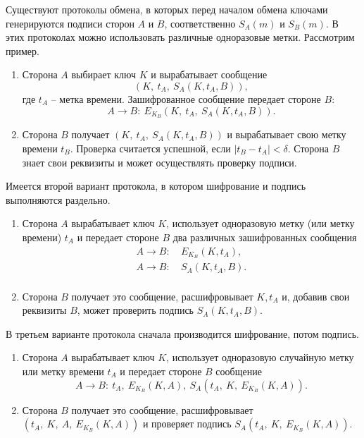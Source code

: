 \documentclass[10pt,a4paper]{book}
\begin{document}
Существуют протоколы обмена, в которых перед началом обмена ключами генерируются подписи сторон $A$ и $B$, соответственно $S_A(m)$ и $S_B(m)$. В этих протоколах можно использовать различные одноразовые метки. Рассмотрим пример.
\begin{enumerate}
    \item Сторона $A$ выбирает ключ $K$ и вырабатывает сообщение
            \[ \left( K, ~ t_A, ~ S_A(K, t_A, B) \right), \]
        где $t_A$ -- метка времени. Зашифрованное сообщение передает стороне $B$:
        \[ A \rightarrow B: ~ E_{K_B}(K, ~ t_A, ~ S_A(K, t_A, B)). \]
    \item Сторона $B$ получает $\left( K, ~ t_A, ~ S_A(K, t_A, B) \right)$ и вырабатывает свою метку времени $t_B$. Проверка считается успешной, если $|t_B - t_A | < \delta $. Сторона $B$ знает свои реквизиты и может осуществлять проверку подписи.
\end{enumerate}

Имеется второй вариант протокола, в котором шифрование и подпись выполняются раздельно.
\begin{enumerate}
    \item Сторона $A$ вырабатывает ключ $K$, использует одноразовую метку (или метку времени) $t_{A}$ и передает стороне $B$ два различных зашифрованных сообщения
            \[ \begin{array}{ll}
                A \rightarrow B: & ~ E_{K_B}(K, t_A), \\
                A \rightarrow B: & ~ S_A(K, t_A, B). \\
            \end{array} \]
    \item Сторона $B$ получает это сообщение, расшифровывает $K, t_A$ и, добавив  свои реквизиты $B$, может проверить подпись $S_A(K, t_A, B)$.
\end{enumerate}

В третьем варианте протокола сначала производится шифрование, потом подпись.
\begin{enumerate}
    \item Сторона $A$ вырабатывает ключ $K$, использует одноразовую случайную метку или метку времени $t_A$ и передает стороне $B$ сообщение
        \[ A \rightarrow B: ~ t_A, ~ E_{K_B}(K, A), ~ S_A(t_A, ~ K, ~ E_{K_B}(K, A)). \]
    \item Сторона $B$ получает это сообщение, расшифровывает $\left( t_A, ~ K, ~ A, ~ E_{K_B}(K, A) \right)$ и проверяет подпись $S_A(t_A, ~ K, ~ E_{K_B}(K, A))$.
\end{enumerate}
\end{document}
